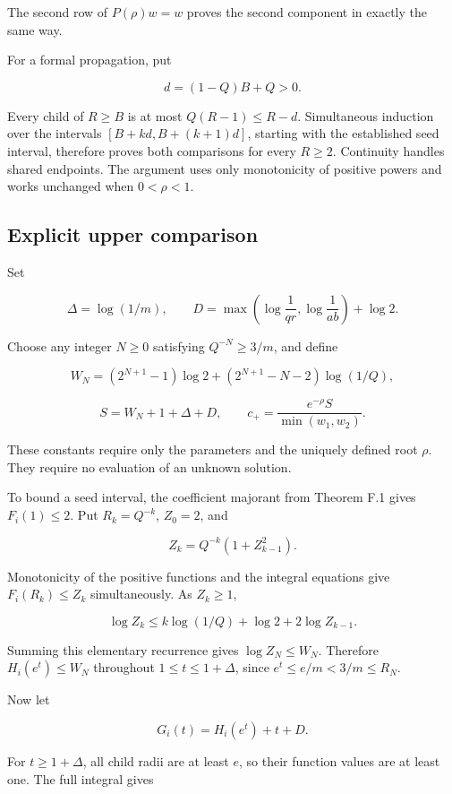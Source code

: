 The second row of \(P(\rho)w=w\) proves the second component in exactly
the same way.

For a formal propagation, put

\[
d=(1-Q)B+Q>0.
\]

Every child of \(R\ge B\) is at most \(Q(R-1)\le R-d\). Simultaneous
induction over the intervals \([B+kd,B+(k+1)d]\), starting with the
established seed interval, therefore proves both comparisons for every
\(R\ge2\). Continuity handles shared endpoints. The argument uses only
monotonicity of positive powers and works unchanged when \(0<\rho<1\).

\hypertarget{v11-coupled_growth_full-explicit-upper-comparison}{%
\subsection{Explicit upper
comparison}\label{v11-coupled_growth_full-explicit-upper-comparison}}

Set

\[
\Delta=\log(1/m),\qquad
D=\max\left(\log\frac1{qr},\log\frac1{ab}\right)+\log2.
\]

Choose any integer \(N\ge0\) satisfying \(Q^{-N}\ge3/m\), and define

\[
W_N=(2^{N+1}-1)\log2
 +(2^{N+1}-N-2)\log(1/Q),
\]

\[
S=W_N+1+\Delta+D,\qquad
c_+=\frac{e^{-\rho}S}{\min(w_1,w_2)}.
\]

These constants require only the parameters and the uniquely defined
root \(\rho\). They require no evaluation of an unknown solution.

To bound a seed interval, the coefficient majorant from Theorem F.1 gives
\(F_i(1)\le2\). Put \(R_k=Q^{-k}\), \(Z_0=2\), and

\[
Z_k=Q^{-k}(1+Z_{k-1}^2).
\]

Monotonicity of the positive functions and the integral equations give
\(F_i(R_k)\le Z_k\) simultaneously. As \(Z_k\ge1\),

\[
\log Z_k\le k\log(1/Q)+\log2+2\log Z_{k-1}.
\]

Summing this elementary recurrence gives \(\log Z_N\le W_N\). Therefore
\(H_i(e^t)\le W_N\) throughout \(1\le t\le1+\Delta\), since
\(e^t\le e/m<3/m\le R_N\).

Now let

\[
G_i(t)=H_i(e^t)+t+D.
\]

For \(t\ge1+\Delta\), all child radii are at least \(e\), so their
function values are at least one. The full integral gives

